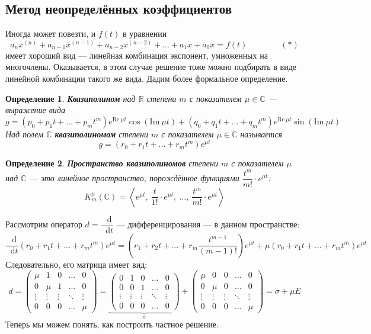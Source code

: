 \documentclass[a4paper,12pt]{article}
\newtheorem{definition}{Определение}
\renewcommand{\Re}{\mathrm{Re\:}}
\renewcommand{\Im}{\mathrm{Im\:}}
\newcommand{\R}{\mathbb{R}}
\renewcommand{\C}{\mathbb{C}}
\renewcommand*\d{\mathop{}\!\mathrm{d}}
\newcommand{\dx}{\dot{x}}
\begin{document}
\subsection{Метод неопределённых коэффициентов}

Иногда может повезти, и $f(t)$  в уравнении
\[a_nx^{(n)} + a_{n - 1}x^{(n - 1)} + a_{n - 2}x^{(n - 2)} + \ldots + a_1\dx + a_0 x = f(t)\qquad \qquad (*)\]
 имеет хороший вид --- линейная комбинация экспонент, умноженных на многочлены. 
Оказывается, в этом случае решение тоже можно подбирать в виде линейной комбинации такого же вида. 
Дадим более формальное определение.

\begin{definition}
	\textbf{Квазиполином} над $\R$ степени $m$ с показателем $\mu \in \C$  --- выражение вида
	\[g = \left(p_0 +  p_1t + \ldots + p_mt^m\right)e^{\Re \mu t} \cos(\Im \mu t) + \left(q_0 +  q_1t + \ldots + q_mt^m\right)e^{\Re \mu t} \sin(\Im \mu t)\]
	Над полем $\C$ \textbf{квазиполиномом} степени $m$ с показателем $\mu \in \C$ называется
	\[g = \left(r_0 +  r_1t + \ldots + r_mt^m\right)e^{\mu t}\]
\end{definition}
\begin{definition}
	\textbf{Пространство квазиполиномов} степени $m$  с показателем $\mu$ над $\C$ --- это линейное пространство, порождённое функциями $\dfrac{t^m}{m!}\cdot e^{\mu t}$:
	\[K_m^\mu(\C) = \left\langle e^{\mu t},\ \dfrac{t}{1!}\cdot e^{\mu t},\ \ldots,\ \dfrac{t^m}{m!}\cdot e^{\mu t}\right\rangle\]
\end{definition}
Рассмотрим оператор $d = \dfrac{\d }{\d t}$ --- дифференцирования --- в данном пространстве:
\[\dfrac{\d }{\d t}\left(r_0 +  r_1t + \ldots + r_mt^m\right)e^{\mu t} = \left(r_1 +  r_2t + \ldots + r_m\dfrac{t^{m - 1}}{(m - 1)!}\right)e^{\mu t} + \mu\left(r_0 +  r_1t + \ldots + r_mt^m\right)e^{\mu t}\]
Следовательно, его матрица имеет вид:
\[d = \begin{pmatrix}
	\mu & 1 & 0 & \ldots & 0\\
	0 	& \mu & 1 & \ldots & 0\\
	\vdots & \vdots & \vdots & \ddots & \vdots\\
	0 & 0 & 0 & \ldots & \mu
	\end{pmatrix} = \underbrace{\begin{pmatrix}
	0 & 1 & 0 & \ldots & 0\\
	0 	& 0 & 1 & \ldots & 0\\
	\vdots & \vdots & \vdots & \ddots & \vdots\\
	0 & 0 & 0 & \ldots & 0
\end{pmatrix}}_{\sigma} + \begin{pmatrix}
	\mu & 0 & 0 & \ldots & 0\\
	0 	& \mu & 0 & \ldots & 0\\
	\vdots & \vdots & \vdots & \ddots & \vdots\\
	0 & 0 & 0 & \ldots & \mu
\end{pmatrix} = \sigma + \mu E\]
Теперь мы можем понять, как построить частное решение. 
\end{document}
